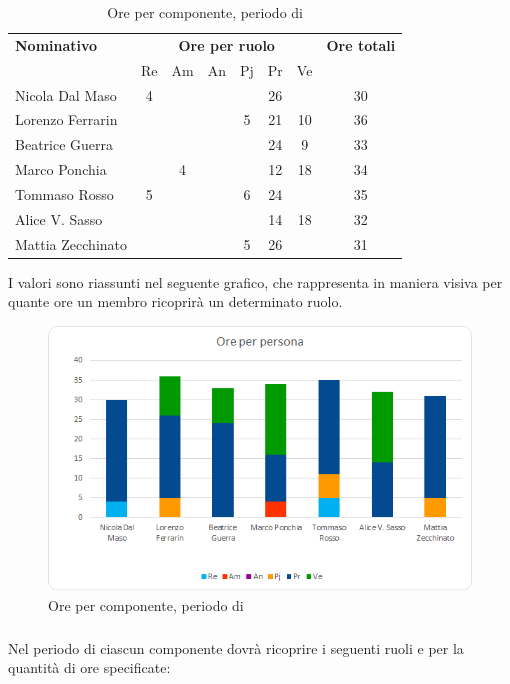 \begin{table}[H]
	\centering
	\begin{tabular}{|l|c|c|c|c|c|c|c|}
		\hline
		\textbf{Nominativo} & 
		\multicolumn{6}{c|}{\textbf{Ore per ruolo}} & 
		\textbf{Ore totali} \\
		& Re & Am & An & Pj & Pr & Ve & \\
		\hline
		Nicola Dal Maso &4 & & & &26 & & 30 \\
		Lorenzo Ferrarin & & & &5 &21 &10 & 36 \\
		Beatrice Guerra & & & & &24 &9 & 33 \\
		Marco Ponchia & &4 & & &12 &18 & 34 \\
		Tommaso Rosso &5 & & &6 &24 & & 35 \\
		Alice V. Sasso & & & & &14 &18 & 32 \\
		Mattia Zecchinato & & & &5 &26 & & 31 \\
		\hline
	\end{tabular}
	\caption{Ore per componente, periodo di \Cod{}}
\end{table}
I valori sono riassunti nel seguente grafico, che rappresenta in maniera visiva per quante ore un membro ricoprirà un determinato ruolo.
\begin{figure}[H]
	\centering
	\includegraphics[width=14cm]{img_suddlavoro/C2.png}
	\caption{Ore per componente, periodo di \Cod{}}
\end{figure}

\subsubsection{\VV}
Nel periodo di \VV{} ciascun componente dovrà ricoprire i seguenti ruoli e per la quantità di ore specificate:

